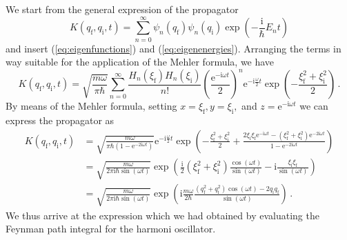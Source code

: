 \documentclass[11pt,DIV=19,parskip=half]{scrartcl}
\begin{document}
We start from the general expression of the propagator
\begin{equation}
  K(q_\text{f}, q_\text{i}, t) = \sum_{n=0}^\infty\psi_n(q_\text{f})\psi_n(q_\text{i})
				      \exp\!\left(-\frac{\text{i}}{\hbar}E_nt\right)
\end{equation}
and insert (\ref{eq:eigenfunctions}) and (\ref{eq:eigenenergies}). Arranging the terms
in way suitable for the application of the Mehler formula, we have
\begin{equation}
  K(q_\text{f}, q_\text{i}, t)
    = \sqrt{\frac{m\omega}{\pi\hbar}}\sum_{n=0}^\infty\frac{H_n(\xi_\text{f})H_n(\xi_\text{i})}{n!}
	\left(\frac{\text{e}^{-\text{i}\omega t}}{2}\right)^n\text{e}^{-\text{i}\frac{\omega}{2}t}
	\exp\!\left(-\frac{\xi_\text{f}^2+\xi_\text{i}^2}{2}\right)\,.
\end{equation}
By means of the Mehler formula, setting $x=\xi_\text{f}, y=\xi_\text{i},$ and
$z=\text{e}^{-\text{i}\omega t}$ we can express the propagator as
\begin{equation}
 \begin{aligned}
  K(q_\text{f}, q_\text{i}, t)
  &= \sqrt{\frac{m\omega}{\pi\hbar(1-\text{e}^{-2\text{i}\omega t})}}\text{e}^{-\text{i}\frac{\omega}{2}t}
     \exp\!\left(-\frac{\xi_\text{f}^2+\xi_\text{i}^2}{2}
 	+\frac{2\xi_\text{i}\xi_\text{f}\text{e}^{-\text{i}\omega t}
 	       -(\xi_\text{f}^2+\xi_\text{i}^2)\text{e}^{-2\text{i}\omega t}}
 	      {1-\text{e}^{-2\text{i}\omega t}}\right)\\
  &= \sqrt{\frac{m\omega}{2\pi\text{i}\hbar\sin(\omega t)}}
     \exp\!\left(\frac{\text{i}}{2}(\xi_\text{f}^2+\xi_\text{i}^2)\frac{\cos(\omega t)}{\sin(\omega t)}
	 -\text{i}\frac{\xi_\text{i}\xi_\text{f}}{\sin(\omega t)}\right)\\
  &= \sqrt{\frac{m\omega}{2\pi\text{i}\hbar\sin(\omega t)}}
     \exp\!\left(\text{i}\frac{m\omega}{2\hbar}\frac{(q_\text{f}^2+q_\text{i}^2)\cos(\omega t)
	 -2q_\text{i}q_\text{f}}{\sin(\omega t)}\right)\,.
 \end{aligned}
\end{equation}
We thus arrive at the expression which we had obtained by evaluating the Feynman path integral for 
the harmoni oscillator.
\end{document}
